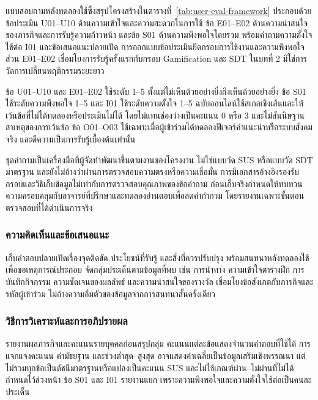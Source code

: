 แบบสอบถามหลังทดลองใช้ซึ่งสรุปโครงสร้างในตารางที่~\ref{tab:user-eval-framework} ประกอบด้วยข้อประเมิน U01--U10 ด้านความเข้าใจและความสะดวกในการใช้ ข้อ E01--E02 ด้านความน่าสนใจของภารกิจและการรับรู้ความก้าวหน้า และข้อ S01 ด้านความพึงพอใจโดยรวม พร้อมคำถามความตั้งใจใช้ต่อ I01 และข้อเสนอแนะปลายเปิด การออกแบบข้อประเมินยึดกรอบการใช้งานและความพึงพอใจ \cite{nielsen2012usability,nistUsabilityTesting} ส่วน E01--E02 เชื่อมโยงการรับรู้ครั้งแรกกับกรอบ Gamification และ SDT ในบทที่ 2 มิใช่การวัดการเปลี่ยนพฤติกรรมระยะยาว

ข้อ U01--U10 และ E01--E02 ใช้ระดับ 1--5 ตั้งแต่ไม่เห็นด้วยอย่างยิ่งถึงเห็นด้วยอย่างยิ่ง ข้อ S01 ใช้ระดับความพึงพอใจ 1--5 และ I01 ใช้ระดับความตั้งใจ 1--5 ฉบับออนไลน์ใช้สเกลเชิงเส้นและให้เว้นข้อที่ไม่ได้ทดลองหรือประเมินไม่ได้ โดยไม่แทนช่องว่างเป็นคะแนน 0 หรือ 3 และไม่สันนิษฐานสาเหตุของการเว้นข้อ ข้อ O01--O03 ใช้เฉพาะเมื่อผู้เข้าร่วมได้ทดลองฟีเจอร์คำแนะนำหรือระบบสังคมจริง และตีความเป็นการรับรู้เบื้องต้นเท่านั้น

ชุดคำถามเป็นเครื่องมือที่ผู้จัดทำพัฒนาขึ้นตามงานของโครงงาน ไม่ใช่แบบวัด SUS หรือแบบวัด SDT มาตรฐาน และยังไม่อ้างว่าผ่านการตรวจสอบความตรงหรือความเชื่อมั่น การมีเอกสารอ้างอิงรองรับกรอบและวิธีเก็บข้อมูลไม่เท่ากับการตรวจสอบคุณภาพของข้อคำถาม ก่อนเก็บจริงกำหนดให้ทบทวนความครอบคลุมกับอาจารย์ที่ปรึกษาและทดลองอ่านตอบเพื่อลดคำกำกวม โดยรายงานเฉพาะขั้นตอนตรวจสอบที่ได้ดำเนินการจริง

\subsubsection{ความคิดเห็นและข้อเสนอแนะ}

เก็บคำตอบปลายเปิดเรื่องจุดติดขัด ประโยชน์ที่รับรู้ และสิ่งที่ควรปรับปรุง พร้อมสนทนาหลังทดลองใช้เพื่อขอเหตุการณ์ประกอบ จัดกลุ่มประเด็นตามข้อมูลที่พบ เช่น การนำทาง ความเข้าใจตารางฝึก การบันทึกกิจกรรม ความชัดเจนของผลลัพธ์ และความน่าสนใจของรางวัล เชื่อมโยงข้อสังเกตกับภารกิจและรหัสผู้เข้าร่วม ไม่อ้างความอิ่มตัวของข้อมูลจากการสนทนาสั้นครั้งเดียว

\subsubsection{วิธีการวิเคราะห์และการอภิปรายผล}

รายงานผลภารกิจและคะแนนรายบุคคลก่อนสรุปกลุ่ม คะแนนแต่ละข้อแสดงจำนวนคำตอบที่ใช้ได้ การแจกแจงคะแนน ค่ามัธยฐาน และช่วงต่ำสุด--สูงสุด อาจแสดงค่าเฉลี่ยเป็นข้อมูลเสริมเชิงพรรณนา แต่ไม่รวมทุกข้อเป็นดัชนีมาตรฐานหรือแปลงเป็นคะแนน SUS และไม่ใช้เกณฑ์ผ่าน--ไม่ผ่านที่ไม่ได้กำหนดไว้ล่วงหน้า ข้อ S01 และ I01 รายงานแยก เพราะความพึงพอใจและความตั้งใจใช้ต่อเป็นคนละประเด็น

